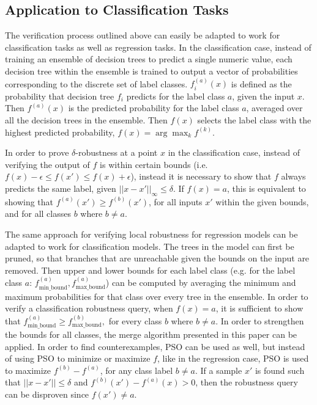 \documentclass[pageno]{jpaper}
\newcommand{\fminb}{f_{\textrm{min\_bound}}}
\newcommand{\fmaxb}{f_{\textrm{max\_bound}}}
\begin{document}
\begin{doublespacing}
\subsection{Application to Classification Tasks}
The verification process outlined above can easily be adapted to work for classification tasks as well as regression tasks. In the classification case, instead of training an ensemble of decision trees to predict a single numeric value, each decision tree within the ensemble is trained to output a vector of probabilities corresponding to the discrete set of label classes. $f_i^{(a)} (x)$ is defined as the probability that decision tree $f_i$ predicts for the label class $a$, given the input $x$. Then $f^{(a)} (x)$ is the predicted probability for the label class $a$, averaged over all the decision trees in the ensemble. Then $f(x)$ selects the label class with the highest predicted probability, $f(x) = \arg \max_k f^{(k)}$.

In order to prove $\delta$-robustness at a point $x$ in the classification case, instead of verifying the output of $f$ is within certain bounds (i.e. $f(x) - \epsilon \le f(x') \le f(x) + \epsilon$), instead it is necessary to show that $f$ always predicts the same label, given $||x - x'||_\infty \le \delta$. If $f(x) = a$, this is equivalent to showing that $f^{(a)} (x') \ge f^{(b)}(x')$, for all inputs $x'$ within the given bounds, and for all classes $b$ where $b \ne a$.

The same approach for verifying local robustness for regression models can be adapted to work for classification models. The trees in the model can first be pruned, so that branches that are unreachable given the bounds on the input are removed. Then upper and lower bounds for each label class (e.g. for the label class $a$: $\fminb^{(a)}, \fmaxb^{(a)}$) can be computed by averaging the minimum and maximum probabilities for that class over every tree in the ensemble. In order to verify a classification robustness query, when $f(x) = a$, it is sufficient to show that $\fminb^{(a)} \ge \fmaxb^{(b)},$ for every class $b$ where $b \ne a$. In order to strengthen the bounds for all classes, the merge algorithm presented in this paper can be applied. In order to find counterexamples, PSO can be used as well, but instead of using PSO to minimize or maximize $f$, like in the regression case, PSO is used to maximize $f^{(b)} - f^{(a)}$, for any class label $b \ne a$. If a sample $x'$ is found such that $||x - x'|| \le \delta$ and  $f^{(b)}(x') - f^{(a)}(x) > 0$, then the robustness query can be disproven since $f(x') \ne a$.


\end{doublespacing}
\end{document}
